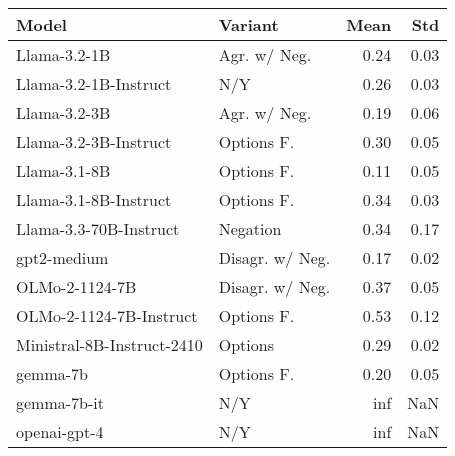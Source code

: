 \begin{tabular}{llrr}
\toprule
Model & Variant & Mean & Std \\
\midrule
Llama-3.2-1B & Agr. w/ Neg. & 0.24 & 0.03 \\
Llama-3.2-1B-Instruct & N/Y & 0.26 & 0.03 \\
Llama-3.2-3B & Agr. w/ Neg. & 0.19 & 0.06 \\
Llama-3.2-3B-Instruct & Options F. & 0.30 & 0.05 \\
Llama-3.1-8B & Options F. & 0.11 & 0.05 \\
Llama-3.1-8B-Instruct & Options F. & 0.34 & 0.03 \\
Llama-3.3-70B-Instruct & Negation & 0.34 & 0.17 \\
gpt2-medium & Disagr. w/ Neg. & 0.17 & 0.02 \\
OLMo-2-1124-7B & Disagr. w/ Neg. & 0.37 & 0.05 \\
OLMo-2-1124-7B-Instruct & Options F. & 0.53 & 0.12 \\
Ministral-8B-Instruct-2410 & Options & 0.29 & 0.02 \\
gemma-7b & Options F. & 0.20 & 0.05 \\
gemma-7b-it & N/Y & inf & NaN \\
openai-gpt-4 & N/Y & inf & NaN \\
\bottomrule
\end{tabular}
